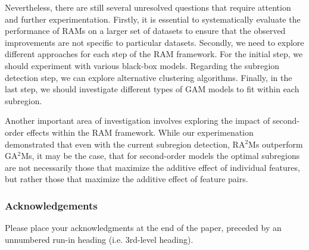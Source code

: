 \documentclass[runningheads]{llncs}
\begin{document}
Nevertheless, there are still several unresolved questions that require attention and further experimentation.
Firstly, it is essential to systematically evaluate the performance of RAMs on a larger set of datasets to ensure that the observed improvements are not specific to particular datasets.
Secondly, we need to explore different approaches for each step of the RAM framework.
For the initial step, we should experiment with various black-box models.
Regarding the subregion detection step, we can explore alternative clustering algorithms.
Finally, in the last step, we should investigate different types of GAM models to fit within each subregion.

Another important area of investigation involves exploring the impact of second-order effects within the RAM framework.
While our experimenation demonstrated that even with the current subregion detection, RA$^2$Ms outperform GA$^2$Ms,
it may be the case, that for second-order models the optimal subregions are not necessarily those that maximize the additive effect of individual features,
but rather those that maximize the additive effect of feature pairs.

\subsubsection{Acknowledgements} Please place your acknowledgments at
the end of the paper, preceded by an unnumbered run-in heading (i.e.
3rd-level heading).


\end{document}
